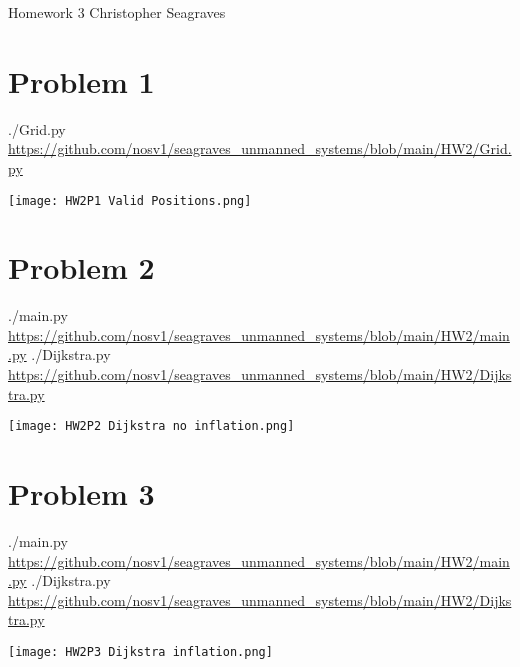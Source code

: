 \documentclass{article}
\begin{document}
    \raggedright
    Homework 3 \break
    Christopher Seagraves

    \section*{Problem 1}
        \begin{minipage}{\linewidth}
            \raggedright
            ./Grid.py \break
            \url{https://github.com/nosv1/seagraves_unmanned_systems/blob/main/HW2/Grid.py}
        \end{minipage}
        \begin{center}
            \texttt{[image: HW2P1 Valid Positions.png]}
        \end{center}
    
        \section*{Problem 2}
            \begin{minipage}{\linewidth}
                \raggedright
                ./main.py \break
                \url{https://github.com/nosv1/seagraves_unmanned_systems/blob/main/HW2/main.py} \break
                ./Dijkstra.py \break
                \url{https://github.com/nosv1/seagraves_unmanned_systems/blob/main/HW2/Dijkstra.py}
                \begin{center}
                    \texttt{[image: HW2P2 Dijkstra no inflation.png]}
                \end{center}
            \end{minipage}

        \section*{Problem 3}
            \begin{minipage}{\linewidth}
                \raggedright
                ./main.py \break
                \url{https://github.com/nosv1/seagraves_unmanned_systems/blob/main/HW2/main.py} \break
                ./Dijkstra.py \break
                \url{https://github.com/nosv1/seagraves_unmanned_systems/blob/main/HW2/Dijkstra.py}
                \begin{center}
                    \texttt{[image: HW2P3 Dijkstra inflation.png]}
                \end{center}
            \end{minipage}
\end{document}
